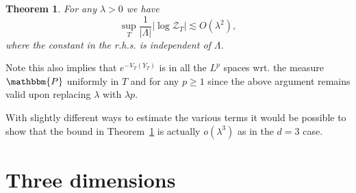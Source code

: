 \documentclass[11pt, oneside]{article}   	%
\newtheorem{theorem}{Theorem}
\newcommand{\CZ}{\mathscr{Z}}
\begin{document}
\begin{theorem}
  \label{th:twod-bound}For any $\lambda > 0$ we have
  \[ \sup_T \frac{1}{| \Lambda |} \left| \log \CZ_T \right| \lesssim O
     (\lambda^2), \]
  where the constant in the r.h.s. is independent of $\Lambda$. 
\end{theorem}

\begin{remark}
  Note this also implies that $e^{- V_T (Y_T)}$ is in all the $L^p$ spaces
  wrt. the measure $\mathbbm{P}$ uniformly in $T$ and for any $p \geqslant 1$
  since the above argument remains valid upon replacing $\lambda$ with
  $\lambda p$.
\end{remark}

\begin{remark}
  With slightly different ways to estimate the various terms it would be
  possible to show that the bound in Theorem~\ref{th:twod-bound} is actually
  $o (\lambda^3)$ as in the $d = 3$ case. 
\end{remark}

\section{Three dimensions}\label{sec:three-d}
\end{document}
